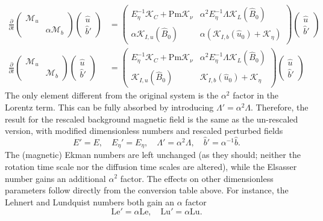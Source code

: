 \[\begin{aligned}
    \frac{\partial}{\partial t} \begin{pmatrix} \mathcal{M}_u & \\ & \alpha \mathcal{M}_b \end{pmatrix}
    \begin{pmatrix} \hat{u} \\ \hat{b}' \end{pmatrix} &= 
    \begin{pmatrix}
        E_\eta^{-1} \mathcal{K}_C + \mathrm{Pm} \mathcal{K}_\nu & \alpha^2 E_\eta^{-1} \Lambda \mathcal{K}_{L}(\hat{B}_0) \\ 
        \alpha \mathcal{K}_{I,u}(\hat{B}_0) & \alpha\left(\mathcal{K}_{I,b}(\hat{u}_0) + \mathcal{K}_\eta\right)
    \end{pmatrix}
    \begin{pmatrix} \hat{u} \\ \hat{b}' \end{pmatrix} \\ 
    \frac{\partial}{\partial t} \begin{pmatrix} \mathcal{M}_u & \\ & \mathcal{M}_b \end{pmatrix}
    \begin{pmatrix} \hat{u} \\ \hat{b}' \end{pmatrix} &= 
    \begin{pmatrix}
        E_\eta^{-1} \mathcal{K}_C + \mathrm{Pm} \mathcal{K}_\nu & \alpha^2 E_\eta^{-1} \Lambda \mathcal{K}_{L}(\hat{B}_0) \\ 
        \mathcal{K}_{I,u}(\hat{B}_0) & \mathcal{K}_{I,b}(\hat{u}_0) + \mathcal{K}_\eta
    \end{pmatrix}
    \begin{pmatrix} \hat{u} \\ \hat{b}' \end{pmatrix}
\end{aligned}\]
The only element different from the original system is the $\alpha^2$ factor in the Lorentz term. This can be fully absorbed by introducing $\Lambda' = \alpha^2 \Lambda$. 
Therefore, the result for the rescaled background magnetic field is the same as the un-rescaled version, with modified dimensionless numbers and rescaled perturbed fields
\begin{equation}
    E' = E, \quad E_\eta' = E_\eta, \quad \Lambda' = \alpha^2 \Lambda, \quad \hat{b}' = \alpha^{-1} \hat{b}.
\end{equation}
The (magnetic) Ekman numbers are left unchanged (as they should; neither the rotation time scale nor the diffusion time scales are altered), while the Elsasser number gains an additional $\alpha^2$ factor.
The effects on other dimensionless parameters follow directly from the conversion table above. For instance, the Lehnert and Lundquist numbers both gain an $\alpha$ factor
\[
    \mathrm{Le}' = \alpha \mathrm{Le},\quad 
    \mathrm{Lu}' = \alpha \mathrm{Lu}.
\]

